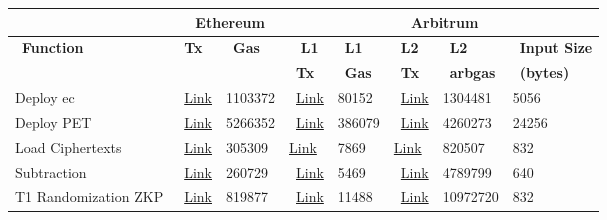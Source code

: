 \begin{table}[]
	\begin{tabular}{|l|l|l|l|l|l|l|l|}
		\hline
		&    \multicolumn{2}{c|}{~\textbf{Ethereum}} & \multicolumn{5}{c|}{~\textbf{Arbitrum}} \\ \hline
	   ~\textbf{Function}  &~\textbf{Tx} &~\textbf{Gas}   & ~\textbf{ L1} & ~\textbf{L1}  & ~\textbf{L2} &~\textbf{L2}& ~\textbf{Input Size} \\ 
	     & &  &~\textbf{Tx} &  ~\textbf{Gas} & ~\textbf{Tx}&~\textbf{arbgas}& ~\textbf{(bytes)} \\ 
		\hline
	    Deploy ec &  ~\href{https://kovan.etherscan.io/tx/0x088af056a640c1fe2188678e52484f89b7ba0bd9345bb0578d91c96aa480c59c}{Link}& 1103372& ~\href{https://kovan.etherscan.io/tx/0xa80f0eb0408f8f1c760abbc223b6a3b24780aba4b85f96ecbd6fb0dfe94bd606}{Link}&80152& ~\href{https://explorer.offchainlabs.com/#/tx/0x7c82717b52cb133c8855c0833d3cbf9ded19f884764fce78de3bb4e27feb63cd}{Link}&1304481&5056\\  \cline{1-8}
	  
	    Deploy PET &  ~\href{https://kovan.etherscan.io/tx/0xb76cda2c91907234afc0b971df893a6dbcdf83d482d2ff3d7d29b4a0b313002f}{Link}&5266352& ~\href{https://kovan.etherscan.io/tx/0x2ec73b92474c991d7b9f8ad1c46f95ef9125513897badb0c0c5faa19bd5b9a55}{Link}&386079& ~\href{https://explorer.offchainlabs.com/#/tx/0x2b1e63c81ca8ab7f4a6fe5333daab515a4e7408121771ae58e205ee037bceb50}{Link}&4260273&24256\\  \cline{1-8}
	
		Load Ciphertexts  & ~\href{https://kovan.etherscan.io/tx/0x2cb4bf0f6ce9fc7cabf0c152fdc61ccfff00a0f2e717c85da7eab806fa101b5b}{Link}&305309 &  \href{https://kovan.etherscan.io/tx/0x612e19481fff4ddd1c2dfe260908f15c7c74072a1e733597b4bab1c1209169f4}{Link}& 7869 &\href{https://explorer.offchainlabs.com/#/tx/0x28b3fa1a91d6d6e13005d352940861a026ac029fbc13a58dc969e98ffb5b392c}{Link} &  820507& 832\\  \cline{1-8}
	
		Subtraction & ~\href{https://kovan.etherscan.io/tx/0x6eeb3031c81af252df1fb806ae0a57643c20792df7336004465c6a74792c0016}{Link}&260729 & ~\href{https://kovan.etherscan.io/tx/0xa31a5653f3bfbdf7bcce4520c2a4f0e8d38fbc5c19036548199f805a4997cf68}{Link} & 5469& ~\href{https://explorer.offchainlabs.com/#/tx/0xbeff60af08f1b88deabe690322e26794d87595b332f1f1d01095a6a4528c4254}{Link} & 4789799& 640\\  \cline{1-8}
	
		T1 Randomization ZKP &~\href{https://kovan.etherscan.io/tx/0x30e8ccff5af6f3489ba2dc11e3198f0216487f380aa2a66ddf97e94650490e88}{Link} &819877 &  ~\href{https://kovan.etherscan.io/tx/0xc08cc82908b7e87e8ddc75695c4f29c3bce3d9a8caced144f003c59e23f4690e}{Link}&  11488&  ~\href{https://explorer.offchainlabs.com/#/tx/0xe3d1ba8bc653397dd67f3bfb602db0acce617668dc2ae2f30e038b4137a60e24}{Link}& 10972720& 832\\  \cline{1-8}
	

\end{tabular}
\end{table}
